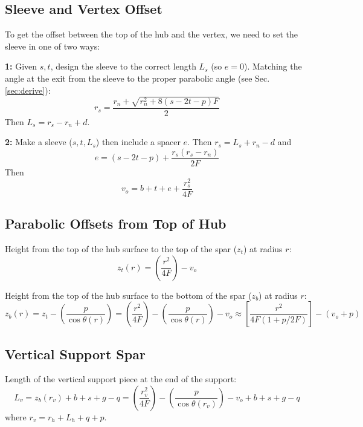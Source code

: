 \documentclass{article}
\begin{document}
\subsection{Sleeve and Vertex Offset}
To get the offset between the top of the hub and the vertex, we need to set the sleeve in one of two ways:

\vspace{.3in}
\noindent
{\bf 1:}  Given $s, t$, design the sleeve to the correct length $L_s$ (so $e=0$).
Matching the angle at the exit from the sleeve to the proper parabolic angle (see Sec. \ref{sec:derive}):
\begin{equation}
r_s = \frac{r_n + \sqrt{r_n^2 + 8(s - 2t - p)F}}{2}
\label{eq:sleeveExitAngle}
\end{equation}
Then $L_s = r_s - r_n + d$.

\vspace{0.2in}
\noindent
{\bf 2:}  Make a sleeve ($s, t, L_s$) then include a spacer $e$.  Then $r_s = L_s + r_n - d$ and 
\begin{equation}
e = (s - 2t - p) + \frac{r_s(r_s - r_n)}{2F}
\label{eq:spacer}
\end{equation}
\noindent
Then
\begin{equation}
v_o = b + t + e + \frac{r_s^2}{4F}
\end{equation}

\subsection{Parabolic Offsets from Top of Hub}
\noindent
Height from the top of the hub surface to the top of the spar ($z_t$) at radius $r$:
\begin{equation}
z_t(r) = \left(\frac{r^2}{4F}\right) - v_o
\end{equation}

\noindent
Height from the top of the hub surface to the bottom of the spar ($z_b$) at radius $r$:
\begin{equation}
z_b(r) = z_t - \left(\frac{p}{\cos\theta(r)}\right) = \left(\frac{r^2}{4F}\right) - \left(\frac{p}{\cos\theta(r)}\right) - v_o \approx \left[\frac{r^2}{4F(1+p/2F)}\right] - (v_o + p)
\end{equation}
 
\subsection{Vertical Support Spar}
\noindent
Length of the vertical support piece at the end of the support:
\begin{equation}
L_v = z_b(r_v) + b + s + g - q = \left(\frac{r_v^2}{4F}\right) - \left(\frac{p}{\cos\theta(r_v)}\right) - v_o + b + s + g - q
\end{equation}
where $r_v = r_h + L_h + q + p$.
\end{document}
